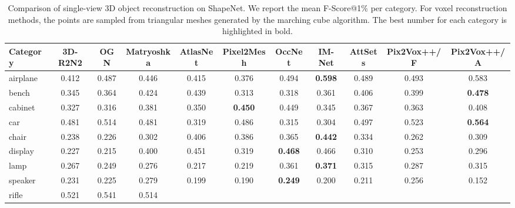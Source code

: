\documentclass[twocolumn]{svjour3}
\begin{document}
\begin{table*}[!t]
  \caption{Comparison of single-view 3D object reconstruction on ShapeNet. We report the mean F-Score@1\% per category. For voxel reconstruction methods, the points are sampled from triangular meshes generated by the marching cube algorithm. The best number for each category is highlighted in bold.}
  \resizebox{\linewidth}{!} {
    \begin{tabular}{lcccccccccc}
      \toprule
      Category     & 3D-R2N2    & OGN        & Matryoshka
                   & AtlasNet   & Pixel2Mesh & OccNet
                   & IM-Net     & AttSets    
                   & Pix2Vox++/F& Pix2Vox++/A \\
      \midrule
      airplane     & 0.412      & 0.487      & 0.446
                   & 0.415      & 0.376      & 0.494
                   & \bf{0.598} & 0.489
                   & 0.493      & 0.583 \\
      bench        & 0.345      & 0.364      & 0.424
                   & 0.439      & 0.313      & 0.318
                   & 0.361      & 0.406
                   & 0.399      & \bf{0.478} \\
      cabinet      & 0.327      & 0.316      & 0.381
                   & 0.350      & \bf{0.450} & 0.449
                   & 0.345      & 0.367
                   & 0.363      & 0.408 \\
      car          & 0.481      & 0.514      & 0.481
                   & 0.319      & 0.486      & 0.315
                   & 0.304      & 0.497
                   & 0.523      & \bf{0.564} \\
      chair        & 0.238      & 0.226      & 0.302
                   & 0.406      & 0.386      & 0.365
                   & \bf{0.442} & 0.334
                   & 0.262      & 0.309 \\
      display      & 0.227      & 0.215      & 0.400
                   & 0.451      & 0.319      & \bf{0.468}
                   & 0.466      & 0.310
                   & 0.253      & 0.296 \\
      lamp         & 0.267      & 0.249      & 0.276
                   & 0.217      & 0.219      & 0.361
                   & \bf{0.371} & 0.315
                   & 0.287      & 0.315 \\
      speaker      & 0.231      & 0.225      & 0.279
                   & 0.199      & 0.190      & \bf{0.249}
                   & 0.200      & 0.211
                   & 0.256      & 0.152 \\
      rifle        & 0.521      & 0.541      & 0.514

\end{tabular}}
\end{table*}
\end{document}

